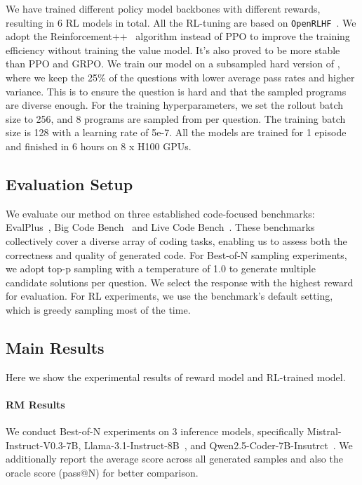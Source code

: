 We have trained different policy model backbones with different rewards, resulting in 6 RL models in total. All the RL-tuning are based on \texttt{OpenRLHF}~\citep{Hu2024OpenRLHFAE}. We adopt the Reinforcement++~\citep{reinforce++} algorithm instead of PPO to improve the training efficiency without training the value model. It's also proved to be more stable than PPO and GRPO. We train our model on a subsampled hard version of \dataset{}, where we keep the 25\% of the questions with lower average pass rates and higher variance. This is to ensure the question is hard and that the sampled programs are diverse enough. For the training hyperparameters, we set the rollout batch size to 256, and 8 programs are sampled from per question. The training batch size is 128 with a learning rate of 5e-7. All the models are trained for 1 episode and finished in 6 hours on 8 x H100 GPUs.


\subsection{Evaluation Setup}
We evaluate our method on three established code-focused benchmarks: EvalPlus~\citep{evalplus, evalperf}, Big Code Bench~\citep{zhuo2024bigcodebench} and Live Code Bench~\citep{jain2024livecodebench}. These benchmarks collectively cover a diverse array of coding tasks, enabling us to assess both the correctness and quality of generated code. For Best-of-N sampling experiments, we adopt top-p sampling with a temperature of 1.0 to generate multiple candidate solutions per question. We select the response with the highest reward for evaluation. For RL experiments, we use the benchmark's default setting, which is greedy sampling most of the time.

\subsection{Main Results}
\label{subsec:main_results}

Here we show the experimental results of reward model and RL-trained model. 
\paragraph{RM Results}
We conduct Best-of-N experiments on 3 inference models, specifically Mistral-Instruct-V0.3-7B\citep{mistral7binstructv03}, Llama-3.1-Instruct-8B~\citep{grattafiori2024llama3herdmodels}, and Qwen2.5-Coder-7B-Insutrct~\citep{hui2024qwen2, qwen2}. We additionally report the average score across all generated samples and also the oracle score (pass@N) for better comparison.

